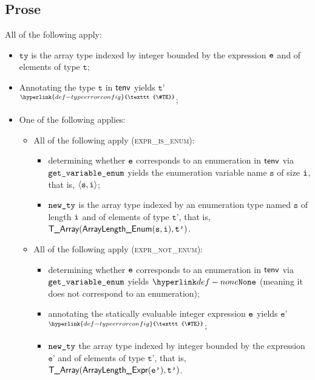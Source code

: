 \documentclass{book}
\newcommand\TypeErrorConfig[0]{\hyperlink{def-typeerrorconfig}{\texttt{\#TE}}}
\newcommand\ProseOrTypeError[0]{\hyperlink{def-proseortypeerror}{$^{\TypeErrorConfig}$}}
\newcommand\vt[0]{\texttt{t}}
\newcommand\vs[0]{\texttt{s}}
\newcommand\tty[0]{\texttt{ty}}
\newcommand\vep[0]{\texttt{e'}}
\newcommand\vtp[0]{\texttt{t'}}
\begin{document}
\subsection{Prose}
All of the following apply:
\begin{itemize}
  \item $\tty$ is the array type indexed by integer bounded by the
    expression $\texttt{e}$ and of elements of type $\vt$;
  \item Annotating the type $\vt$ in $\textsf{tenv}$ yields $\vtp$ \ProseOrTypeError;
  \item One of the following applies:
  \begin{itemize}
    \item All of the following apply (\textsc{expr\_is\_enum}):
    \begin{itemize}
      \item determining whether $\texttt{e}$ corresponds to an enumeration in $\textsf{tenv}$
      via \\ $\texttt{get\_variable\_enum}$ yields the enumeration variable
      name $\vs$ of size $\texttt{i}$, that is, $\langle \vs, \vi \rangle$;
      \item $\texttt{new\_ty}$ is the array type indexed by an enumeration type
      named $\vs$ of length $\texttt{i}$ and of elements of type $\vtp$, that is, $\TArray(\ArrayLengthEnum(\vs, \vi), \vtp)$.
    \end{itemize}

    \item All of the following apply (\textsc{expr\_not\_enum}):
    \begin{itemize}
      \item determining whether $\texttt{e}$ corresponds to an enumeration in $\textsf{tenv}$
      via \\ $\texttt{get\_variable\_enum}$ yields $\None$ (meaning it does not
      correspond to an enumeration);
      \item annotating the statically evaluable integer expression $\texttt{e}$ yields
      $\vep$ \ProseOrTypeError;
      \item $\texttt{new\_ty}$ the array type indexed by integer bounded by
      the expression $\vep$ and of elements of type $\vtp$, that is,
      $\TArray(\ArrayLengthExpr(\vep), \vtp)$.
    \end{itemize}


\end{itemize}
\end{itemize}
\end{document}
